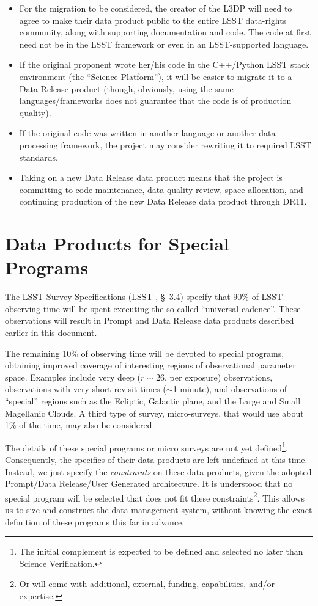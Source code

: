 \begin{itemize}
    \item For the migration to be considered, the creator of the L3DP will need to agree to make their data product public to the entire LSST data-rights community, along with supporting documentation and code. The code at first need not be in the LSST framework or even in an LSST-supported language.
    \item If the original proponent wrote her/his code in the C++/Python LSST stack environment (the ``Science Platform''), it will be easier to migrate it to a Data Release product (though, obviously, using the same languages/frameworks does not guarantee that the code is of production quality).
    \item If the original code was written in another language or another data processing framework, the project may consider rewriting it to required LSST standards.
    \item Taking on a new Data Release data product means that the project is committing to code maintenance, data quality review, space allocation, and continuing production of the new Data Release data product through DR11.
\end{itemize}

\clearpage

\section{Data Products for Special Programs}
\label{sec:specialProgs}

The LSST Survey Specifications (LSST \SRD, \S~3.4) specify that 90\% of LSST observing time will be spent executing the so-called ``universal cadence''. These observations will result in Prompt and Data Release data products described earlier in this document.

The remaining 10\% of observing time will be devoted to special programs, obtaining improved coverage of interesting regions of observational parameter space. Examples include very deep ($r\sim26$, per exposure) observations, observations with very short revisit times ($\sim$1 minute), and observations of ``special'' regions such as the Ecliptic, Galactic plane, and the Large and Small Magellanic Clouds. A third type of survey, micro-surveys, that would use about 1\% of the time, may also be considered.

The details of these special programs or micro surveys are not yet defined\footnote{The initial complement is expected to be defined and selected no later than Science Verification.}. Consequently, the specifics of their data products are left undefined at this time. Instead, we just specify the \emph{constraints} on these data products, given the adopted Prompt/Data Release/User Generated architecture. It is understood that no special program will be selected that does not fit these constraints\footnote{Or will come with additional, external, funding, capabilities, and/or expertise.}. This allows us to size and construct the data management system, without knowing the exact definition of these programs this far in advance.

